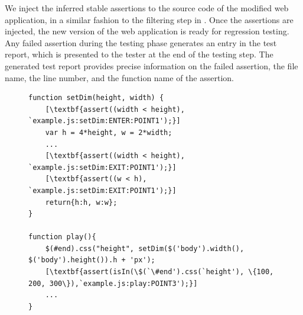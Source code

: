We inject the inferred stable assertions to the \javascript source code of the modified web application, in a similar fashion to the filtering step in . Once the assertions are injected, the new version of the web application is ready for regression testing. Any failed assertion during the testing phase generates an entry in the test report, which is presented to the tester at the end of the testing step.
The generated test report provides precise information on the failed assertion, the file name,  the line number, and the function name of the assertion.

\begin{figure}[h]
\begin{lstlisting}
function setDim(height, width) {
	[\textbf{assert((width < height), `example.js:setDim:ENTER:POINT1');}] 			
	var h = 4*height, w = 2*width;		
	...
	[\textbf{assert((width < height), `example.js:setDim:EXIT:POINT1');}]
	[\textbf{assert((w < h), `example.js:setDim:EXIT:POINT1');}]
	return{h:h, w:w};
}

function play(){
	$(#end).css("height", setDim($('body').width(), $('body').height()).h + 'px');
	[\textbf{assert(isIn(\$(`\#end').css(`height'), \{100, 200, 300\}),`example.js:play:POINT3');}]
	...
}
\end{lstlisting}
\label{Fig:example_assertion}
\end{figure}


